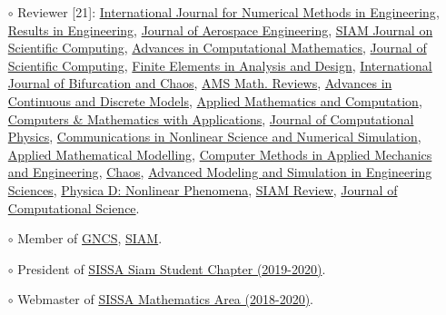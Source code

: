 \documentclass[
  usegeometry%
]{scrartcl}
\begin{document}
\begin{cv}{}
{\begin{itemize}
    \item[$\circ$] Reviewer [21]: \href{https://onlinelibrary.wiley.com/journal/10970207}{ International Journal for Numerical Methods in Engineering}, \href{https://www.sciencedirect.com/journal/results-in-engineering}{Results in Engineering}, \href{https://ascelibrary.org/journal/jaeeez}{Journal of Aerospace Engineering}, \href{https://sisc.siam.org}{SIAM Journal on Scientific Computing}, \href{https://www.springer.com/journal/10444}{Advances in Computational Mathematics}, \href{https://www.springer.com/journal/10915}{Journal of Scientific Computing}, \href{https://www.sciencedirect.com/journal/finite-elements-in-analysis-and-design}{Finite Elements in Analysis and Design}, \href{https://www.worldscientific.com/worldscinet/ijbc}{International Journal of Bifurcation and Chaos}, \href{http://www.ams.org/publications/math-reviews/math-reviews}{AMS Math. Reviews}, \href{https://advancesindifferenceequations.springeropen.com}{Advances in Continuous and Discrete Models}, \href{https://www.sciencedirect.com/journal/applied-mathematics-and-computation}{Applied Mathematics and Computation}, \href{https://www.sciencedirect.com/journal/computers-and-mathematics-with-applications}{Computers \& Mathematics with Applications}, \href{https://www.sciencedirect.com/journal/journal-of-computational-physics}{Journal of Computational Physics}, \href{https://www.sciencedirect.com/journal/communications-in-nonlinear-science-and-numerical-simulation}{Communications in Nonlinear Science and Numerical Simulation}, \href{https://www.sciencedirect.com/journal/applied-mathematical-modelling}{Applied Mathematical Modelling}, \href{https://www.sciencedirect.com/journal/computer-methods-in-applied-mechanics-and-engineering}{Computer Methods in Applied Mechanics and Engineering}, \href{https://pubs.aip.org/aip/cha}{Chaos}, \href{https://amses-journal.springeropen.com}{Advanced Modeling and Simulation in Engineering Sciences}, \href{https://www.sciencedirect.com/journal/physica-d-nonlinear-phenomena}{Physica D: Nonlinear Phenomena}, \href{https://epubs.siam.org/journal/sirev}{SIAM Review}, \href{https://www.sciencedirect.com/journal/journal-of-computational-science}{Journal of Computational Science}.
    \item[$\circ$] Member of \href{https://www.altamatematica.it/gncs/}{GNCS}, \href{https://www.siam.org}{SIAM}. %
    \item[$\circ$] President of \href{http://www.math.sissa.it/content/sissa-siam-student-chapter}{SISSA Siam Student Chapter (2019-2020)}.
    \item[$\circ$] Webmaster of \href{https://www.math.sissa.it/content/mathematical-analysis-modelling-and-applications-0}{SISSA Mathematics Area (2018-2020)}.
\end{itemize}}


\end{cv}
\end{document}

